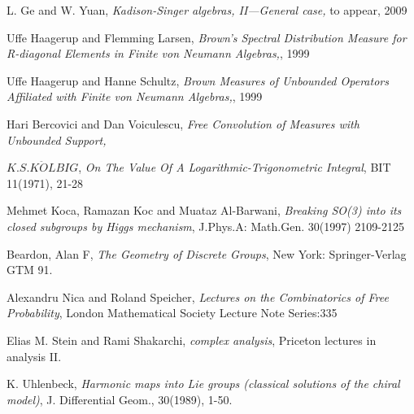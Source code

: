\documentclass{amsart}
\begin{document}

\begin{thebibliography}{21}

 L. Ge and W. Yuan, {\em Kadison-Singer algebras,
II---General case,} to appear, 2009

 Uffe Haagerup and Flemming Larsen, {\em Brown's Spectral Distribution Measure for
R-diagonal Elements in Finite von Neumann Algebras,}, 1999

 Uffe Haagerup and Hanne Schultz, {\em Brown Measures of Unbounded Operators Affiliated with
 Finite von Neumann Algebras,}, 1999

 Hari Bercovici and Dan Voiculescu, {\em Free Convolution of Measures with Unbounded Support, }

 $K.S.K\ddot{O}LBIG$, {\em On The Value Of A Logarithmic-Trigonometric Integral}, BIT 11(1971), 21-28

 Mehmet Koca, Ramazan Koc and Muataz Al-Barwani, {\em Breaking SO(3) into its closed subgroups by Higgs mechanism},
J.Phys.A: Math.Gen. 30(1997) 2109-2125

 Beardon, Alan F, {\em The Geometry of Discrete Groups}, New York: Springer-Verlag GTM 91.

 Alexandru Nica and Roland Speicher, {\em Lectures on the Combinatorics of Free Probability},
London Mathematical Society Lecture Note Series:335

 Elias M. Stein and Rami Shakarchi, {\em complex analysis}, Priceton lectures in analysis II.

 K. Uhlenbeck, {\em Harmonic maps into Lie groups (classical solutions of the chiral model)}, J. Differential Geom., 30(1989), 1-50. 
\end{thebibliography}
\end{document}
